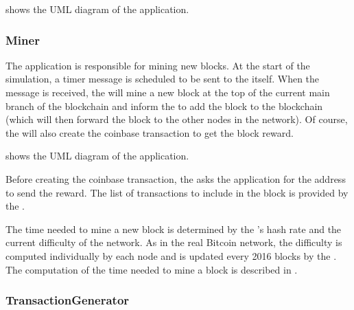 shows the UML diagram of the application.

\subsubsection{Miner}\label{subsubsec:miner}

The  application is responsible for mining new blocks. At the start
of the simulation, a  timer message is scheduled to be sent
to the  itself. When the message is received, the  will
mine a new block at the top of the current main branch of the blockchain and
inform the  to add the block to the blockchain (which
will then forward the block to the other nodes in the network). Of course, the
 will also create the coinbase transaction to get the block
reward.

 shows the UML diagram of the application.

Before creating the coinbase transaction, the  asks the
 application for the address to send the reward. The list of
transactions to include in the block is provided by the .

The time needed to mine a new block is determined by the 's hash
rate and the current difficulty of the network. As in the real Bitcoin network,
the difficulty is computed individually by each node and is updated every 2016
blocks by the . The computation of the time needed to
mine a block is described in .

\subsubsection{TransactionGenerator}\label{subsubsec:transactiongenerator}
